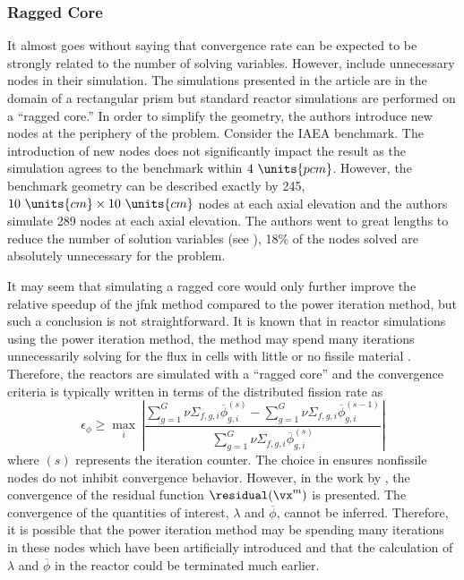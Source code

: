     \subsubsection{Ragged Core}
      It almost goes without saying that convergence rate can be expected to be
      strongly related to the number of solving variables. However,
      \citeauthor{qe2paper} include unnecessary nodes in their simulation. The
      simulations presented in the article are in the domain of a rectangular
      prism but standard reactor simulations are performed on a ``ragged core.''
      In order to simplify the geometry, the authors introduce new nodes at the
      periphery of the problem. Consider the IAEA benchmark. The introduction of
      new nodes does not significantly impact the result as the simulation
      agrees to the benchmark within $4~\units{pcm}$. However, the benchmark
      geometry can be described exactly by 245, $10~\units{cm} \times
      10~\units{cm}$ nodes at each axial elevation and the authors simulate 289
      nodes at each axial elevation. The authors went to great lengths to reduce
      the number of solution variables (see ), 18\%
      of the nodes solved are absolutely unnecessary for the problem.

      It may seem that simulating a ragged core would only further improve the
      relative speedup of the \gls{jfnk} method compared to the power iteration
      method, but such a conclusion is not straightforward. It is known that in
      reactor simulations using the power iteration method, the method may spend
      many iterations unnecessarily solving for the flux in cells with little or
      no fissile material \cite{gehinThesis}. Therefore, the reactors are
      simulated with a ``ragged core'' and the convergence criteria is typically
      written in terms of the distributed fission rate as
      \begin{equation}
        \label{eq:power_iteration_convergence}
        \epsilon_{\phi} \ge \max_{i} \, \left\lvert 
          \frac{\sum_{g=1}^{G} \nu\Sigma_{f,g,i} \overline{\phi}_{g,i}^{(s)} - 
          \sum_{g=1}^{G} \nu\Sigma_{f,g,i} \overline{\phi}_{g,i}^{(s-1)}}
          {\sum_{g=1}^{G} \nu\Sigma_{f,g,i} \overline{\phi}_{g,i}^{(s)}}
          \right\rvert
      \end{equation}
      where $(s)$ represents the iteration counter. The choice in
       ensures nonfissile nodes do not
      inhibit convergence behavior. However, in the work by
      \citeauthor{qe2paper}, the convergence of the residual function
      $\residual(\vx^m)$ is presented.  The convergence of the quantities of
      interest, $\lambda$ and $\overline{\phi}$, cannot be inferred. Therefore,
      it is possible that the power iteration method may be spending many
      iterations in these nodes which have been artificially introduced and that
      the calculation of $\lambda$ and $\overline{\phi}$ in the reactor could be
      terminated much earlier.

